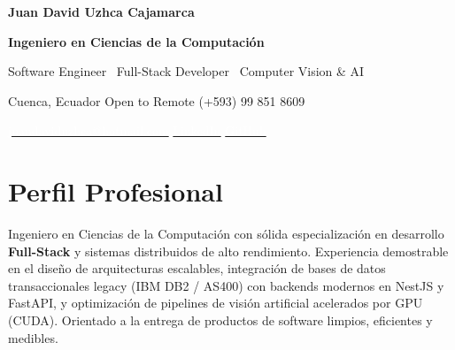 \documentclass[10pt,a4paper]{article}
\begin{document}
\begin{headerbox}
    \centering

    {\fontsize{27}{30}\selectfont
    \bfseries\color{white} Juan David Uzhca Cajamarca}

    \vspace{3pt}

    {\large\bfseries\color{white}
    Ingeniero en Ciencias de la Computación}

    \vspace{2pt}

    {\normalsize\color{lightblue}
    Software Engineer \textbar\ Full-Stack Developer
    \textbar\ Computer Vision \& AI}

    \vspace{9pt}

    {\small\color{white}
    Cuenca, Ecuador
    \quad\textcolor{blue!50}{\textbullet}\quad
    Open to Remote
    \quad\textcolor{blue!50}{\textbullet}\quad
    (+593) 99 851 8609}

    \vspace{4pt}

    {\small\color{white}
    \href{mailto:juandaviduzhca@hotmail.com}
    {\textcolor{white}{juandaviduzhca@hotmail.com}}
    \quad\textcolor{blue!50}{\textbullet}\quad
    \href{https://linkedin.com/in/david-uzhca-5b5439442}
    {\textcolor{white}{LinkedIn}}
    \quad\textcolor{blue!50}{\textbullet}\quad
    \href{https://github.com/David5Uzhca}
    {\textcolor{white}{GitHub}}}
\end{headerbox}

\vspace{3pt}

\section{Perfil Profesional}

\justifying
Ingeniero en Ciencias de la Computación con sólida especialización en desarrollo \textbf{Full-Stack} y sistemas distribuidos de alto rendimiento. Experiencia demostrable en el diseño de arquitecturas escalables, integración de bases de datos transaccionales legacy (IBM DB2 / AS400) con backends modernos en NestJS y FastAPI, y optimización de pipelines de visión artificial acelerados por GPU (CUDA). Orientado a la entrega de productos de software limpios, eficientes y medibles.
\end{document}
